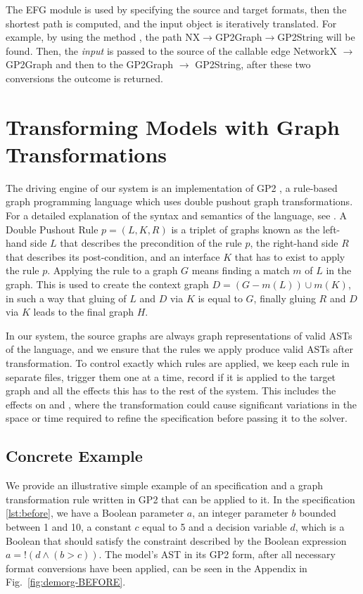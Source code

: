\documentclass[runningheads]{llncs}
\begin{document}
The EFG module is used by specifying the source and target formats, then the shortest path is computed, and the input object is iteratively translated. For example, by using the method , the path NX$\rightarrow$GP2Graph$\rightarrow$GP2String will be found. Then, the \emph{input} is passed to the source of the callable edge NetworkX $\rightarrow$ GP2Graph and then to the GP2Graph $\rightarrow$ GP2String, after these two conversions the outcome is returned.


\section{Transforming Models with Graph Transformations}

The driving engine of our system is an implementation of GP2 \cite{10.1007/978-3-319-40530-8_7}, a rule-based graph programming language which uses double pushout graph transformations. For a detailed explanation of the syntax and semantics of the language, see \cite{plump2017imperative}.
A Double Pushout Rule $p = (L, K, R)$ is a triplet of graphs known as the left-hand side $L$ that describes the precondition of the rule $p$, the right-hand side $R$ that describes its post-condition, and an interface $K$ that has to exist to apply the rule $p$. Applying the rule to a graph $G$ means finding a match $m$ of $L$ in the graph. This is used to create the context graph $D=(G-m(L))\cup m(K)$, in such a way that gluing of $L$ and $D$ via $K$ is equal to $G$, finally gluing $R$ and $D$ via $K$ leads to the final graph $H$.

In our system, the source graphs are always graph representations of valid ASTs of the \essence language, and we ensure that the rules we apply produce valid \essence ASTs after transformation. To control exactly which rules are applied, we keep each rule in separate files, trigger them one at a time, record if it is applied to the target graph and all the effects this has to the rest of the system. This includes the effects on \conjure and \savilerow, where the transformation could cause significant variations in the space or time required to refine the specification before passing it to the solver.


\subsection{Concrete Example}

We provide an illustrative simple example of an \essence specification and a graph transformation rule written in GP2 that can be applied to it. In the specification \ref{lst:before}, we have a Boolean parameter $a$, an integer parameter $b$ bounded between 1 and 10, a constant $c$ equal to 5 and a decision variable $d$, which is a Boolean that should satisfy the constraint described by the Boolean expression $a=!(d \land (b>c))$. The model's AST in its GP2 form, after all necessary format conversions have been applied, can be seen in the Appendix in Fig.~\ref{fig:demorg-BEFORE}. 
\end{document}
